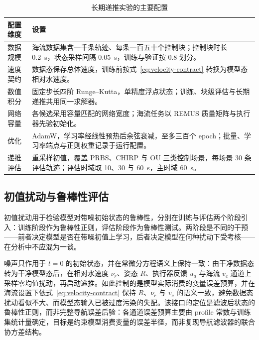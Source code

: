 \begin{table}[htbp]
  \centering
  \caption{长期递推实验的主要配置}
  \label{tab:experimental-config}
  \begin{tabularx}{\textwidth}{>{\raggedright\arraybackslash}p{}>{\raggedright\arraybackslash}X}
    \toprule
    配置维度 & 设置 \\
    \midrule
    数据规模 & 海流数据集含一千条轨迹、每条一百五十个控制块；控制块时长 0.2~s，状态采样间隔 0.05~s，训练与验证按 \(0.8\) 划分。 \\
    速度契约 & 数据态保存总体速度，训练前按式~\eqref{eq:velocity-contract} 转换为模型态相对水速度。 \\
    数值积分 & 固定步长四阶 Runge--Kutta，单精度浮点状态；训练、块级评估与长期递推共用同一求解器。 \\
    网络容量 & 各候选采用容量匹配的网络宽度；海流任务以 REMUS 质量矩阵与执行器先验初始化。 \\
    优化 & AdamW，学习率经线性预热后余弦衰减，至多三百个 epoch；批量、学习率端点与正则权重记录于运行配置。 \\
    递推评估 & 重采样初值，覆盖 PRBS、CHIRP 与 OU 三类控制场景，每场景 30 条评估轨迹；评估时域取 10、30 与 60~s，主时域 60~s。 \\
    \bottomrule
  \end{tabularx}
\end{table}

\subsection{初值扰动与鲁棒性评估}
\label{subsec:ic-perturbation}

初值扰动用于检验模型对带噪初始状态的鲁棒性，分别在训练与评估两个阶段引入：训练阶段作为鲁棒性正则，评估阶段作为鲁棒性测试。两阶段是不同的干预——前者决定模型是否在带噪初值上学习，后者决定模型在何种扰动下受考核——在分析中不应混为一谈。

噪声只作用于 \(t=0\) 的初始状态，并在常微分方程语义上保持一致：由干净数据态转为干净模型态后，在相对水速度 \(\nu_r\)、姿态 \(R\)、执行器反馈 \(u_a\) 与海流 \(v_c\) 通道上采样零均值扰动，再启动递推。如此控制的是模型实际消费的变量误差预算，并在海流设置下依式~\eqref{eq:velocity-contract} 保持 \(R\)、\(\nu_r\) 与 \(v_c\) 的语义一致，避免数据态扰动看似不大、而模型态输入已被过度污染的失配。该接口的定位是滤波后状态的鲁棒性正则，而非完整导航误差后验：各通道误差预算主要由 profile 常数与训练集统计量确定，目标是约束模型消费变量的误差半径，而非复现导航滤波器的联合协方差结构。

